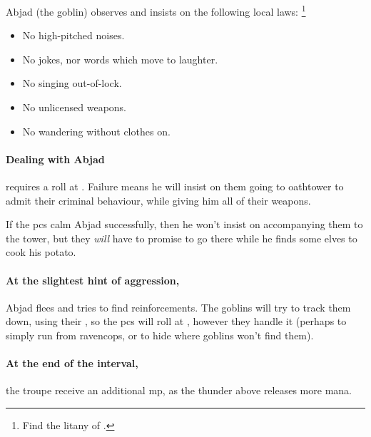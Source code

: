 \begin{multicols}{2}
Abjad (the goblin) observes and insists on the following local laws:%
\footnote{Find the litany of  .}
\label{ravencopsLaws}

\begin{itemize}
  \item
  No high-pitched noises.
  \item
  No jokes, nor words which move to laughter.
  \item
  No singing out-of-lock.
  \item
  No unlicensed weapons.
  \item
  No wandering without clothes on.
\end{itemize}


\paragraph{Dealing with Abjad}
requires a  roll at \tn[9].
Failure means he will insist on them going to \gls{oathtower} to admit their criminal behaviour, while giving him all of their \glspl{weapon}.

If the \glspl{pc} calm Abjad successfully, then he won't insist on accompanying them to the tower, but they \emph{will} have to promise to go there while he finds some elves to cook his potato.

\paragraph{At the slightest hint of aggression,}
Abjad flees and tries to find reinforcements.
The goblins will try to track them down, using their , so the \glspl{pc} will roll at \tn, however they handle it (perhaps  to simply run from \gls{ravencops}, or  to hide where goblins won't find them).

\paragraph{At the end of the \gls{interval},}
the troupe receive an additional \gls{mp}, as the thunder above releases more mana.


\end{multicols}

\stopcontents[segments]
